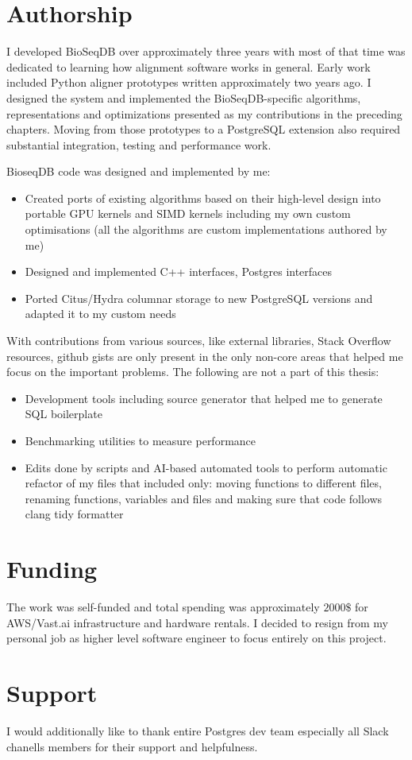 \label{sec:arch-authorship}

\section{Authorship}

I developed BioSeqDB over approximately three years with most of that time was dedicated to learning how alignment software works in general. Early work included
Python aligner prototypes written approximately two years ago. I
designed the system and implemented the BioSeqDB-specific algorithms,
representations and optimizations presented as my contributions in the
preceding chapters. Moving from those prototypes to a PostgreSQL extension
also required substantial integration, testing and performance work.

BioseqDB code was designed and implemented by me:
\begin{itemize}
  \item Created ports of existing algorithms based on their high-level design into portable GPU kernels and SIMD kernels including my own custom optimisations (all the algorithms are custom implementations authored by me)
  \item Designed and implemented C++ interfaces, Postgres interfaces
  \item Ported Citus/Hydra columnar storage to new PostgreSQL versions and adapted it to my custom needs
\end{itemize}

With contributions from various sources, like external libraries, Stack Overflow resources, github gists are only present in the only non-core areas that helped me focus on the important problems. The following are not a part of this thesis:
\begin{itemize}
  \item Development tools including source generator that helped me to generate SQL boilerplate
  \item Benchmarking utilities to measure performance
  \item Edits done by scripts and AI-based automated tools to perform automatic refactor of my files that included only: moving functions to different files, renaming functions, variables and files and making sure that code follows clang tidy formatter
\end{itemize}

\section{Funding}

The work was self-funded and total spending was approximately $2000\$$ for AWS/Vast.ai infrastructure and hardware rentals.
I decided to resign from my personal job as higher level software engineer to focus entirely on this project.

\section{Support}

I would additionally like to thank entire Postgres dev team especially all Slack chanells members for their support and helpfulness.